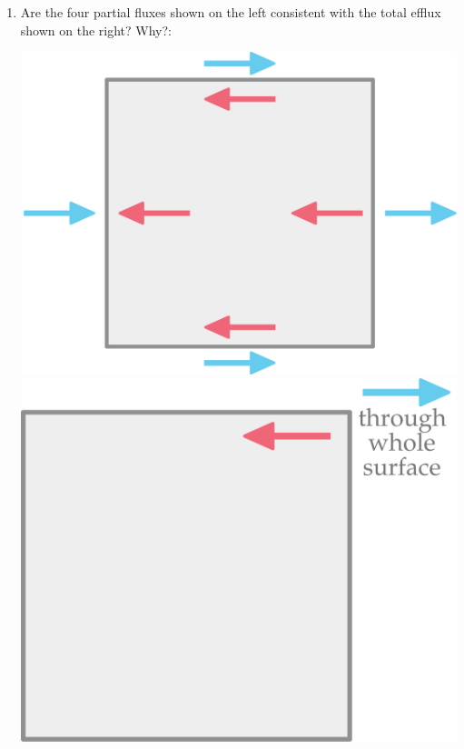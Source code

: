 \documentclass[a4paper,12pt,%
onecolumn,oneside,titlepage,%
british%
]{memoir}
\renewcommand*{\|}[1][]{\nonscript\:#1\vert\nonscript\:\mathopen{}}
\begin{document}
\begin{exercise}
  \begin{enumerate}[para,label=\bfseries\arabic*.]
  \item Are the four partial fluxes shown on the left consistent with the total efflux shown on the right? Why?:
    \begin{center}
  \hspace*{\fill}
  \includegraphics[align=t,scale=0.08]{images/flux_square.pdf}
  \hfill
  \includegraphics[align=t,scale=0.08]{images/flux_square_sum.pdf}
  \hspace*{\fill}
\end{center}


\end{enumerate}
\end{exercise}
\end{document}
